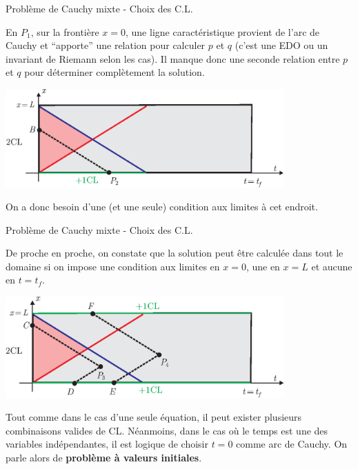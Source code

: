 \documentclass[
mode=present,    %
paper=a4paper,   %
orient=landscape,
display=slides,   %
size=10pt,
style=romain   %
]{powerdot}
\begin{document}
\begin{slide}[toc=]{Problème de Cauchy mixte - Choix des C.L.}

En $P_1$, sur la frontière $x=0$, une ligne caractéristique provient de l'arc de Cauchy et ``apporte'' une relation pour calculer $p$ et $q$ (c'est une EDO ou un invariant de Riemann selon les cas). Il manque donc une seconde relation entre $p$ et $q$ pour déterminer complètement la solution.


    \centerline{\includegraphics[width=0.8\textwidth]{mixte2b.eps} }

\bigskip

On a donc besoin d'une (et une seule) condition aux limites à cet endroit.

\end{slide}




\begin{slide}[toc=]{Problème de Cauchy mixte - Choix des C.L.}

De proche en proche, on constate que la solution peut être calculée dans tout le domaine si on impose une condition aux limites en $x=0$, une en $x=L$ et aucune en $t=t_f$.

\bigskip

    \centerline{\includegraphics[width=0.8\textwidth]{mixte2c.eps} }

\bigskip

Tout comme dans le cas d'une seule équation, il peut exister plusieurs combinaisons valides de CL. Néanmoins, dans le cas où le temps est une des variables indépendantes, il est logique de choisir $t=0$ comme arc de Cauchy. On parle alors de \textbf{problème à valeurs initiales}.


\end{slide}
\end{document}
